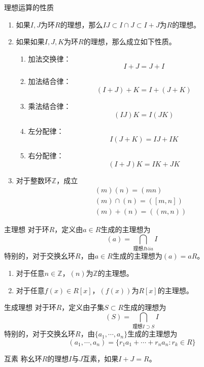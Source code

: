 \documentclass[lang = cn, scheme = chinese, thmcnt = section]{elegantbook}
\begin{document}
\begin{proposition}{理想运算的性质}
	\begin{enumerate}
		\item 如果$I,J$为环$R$的理想，那么$IJ\subset I\cap J\subset I+J$为$R$的理想。
		\item 如果如果$I,J,K$为环$R$​的理想，那么成立如下性质。
		\begin{enumerate}
			\item 加法交换律：
			$$
			I+J=J+I
			$$
			\item 加法结合律：
			$$
			(I+J)+K=I+(J+K)
			$$
			\item 乘法结合律：
			$$
			(IJ)K=I(JK)
			$$
			\item 左分配律：
			$$
			I(J+K)=IJ+IK
			$$
			\item 右分配律：
			$$
			(I+J)K=IK+JK
			$$
		\end{enumerate}
		\item 对于整数环$\mathbb{Z}$，成立
		\begin{align*}
			&(m)(n)=(mn)\\
			&(m)\cap (n)=([m,n])\\
			&(m)+(n)=((m,n))
		\end{align*}
	\end{enumerate}
\end{proposition}

\begin{definition}{主理想}
	对于环$R$，定义由$a\in R$生成的主理想为
	$$
	(a)=\bigcap_{理想I\mathbb{N}i a}I
	$$
	特别的，对于交换幺环$R$，由$a\in R$生成的主理想为$(a)=aR$。
\end{definition}

\begin{proposition}
	\begin{enumerate}
		\item 对于任意$n\in\mathbb{Z}$，$(n)$为$\mathbb{Z}$的主理想。
		\item 对于任意$f(x)\in R[x]$，$(f(x))$为$R[x]$的主理想。
	\end{enumerate}
\end{proposition}

\begin{definition}{生成理想}
	对于环$R$，定义由子集$S\subset R$生成的理想为
	$$
	(S)=\bigcap_{理想I\supset S}I
	$$
	特别的，对于交换幺环$R$，由$\{a_1,\cdots,a_n\}$生成的主理想为
	$$
	(a_1,\cdots,a_n)=\{ r_1a_1+\cdots+r_na_n:r_k\in R \}
	$$
\end{definition}

\begin{definition}{互素}
	称幺环$R$的理想$I$与$J$互素，如果$I+J=R$。
\end{definition}
\end{document}
